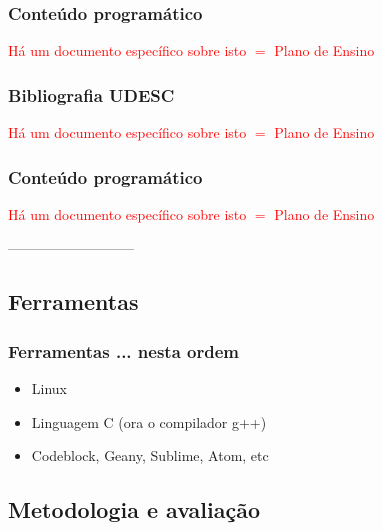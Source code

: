 \begin{frame}
\frametitle{Conteúdo programático}

   \textcolor{red}{Há um documento específico sobre isto $=$ Plano de Ensino}
    
\end{frame}


\begin{frame}
\frametitle{Bibliografia UDESC}

    \textcolor{red}{Há um documento específico sobre isto $=$ Plano de Ensino}
      
 \end{frame}


\begin{frame}
\frametitle{Conteúdo programático}

 \textcolor{red}{Há um documento específico sobre isto $=$ Plano de Ensino}

\end{frame}
---------------------------

\subsection{Ferramentas}
\begin{frame}

    \frametitle{Ferramentas ... nesta ordem}

    \begin{itemize}
     \item Linux 
      \item Linguagem C (ora o compilador g++)
      \item Codeblock, Geany, Sublime, Atom, etc
            

      
    \end{itemize}
\end{frame}


\subsection{Metodologia e avaliação}  

